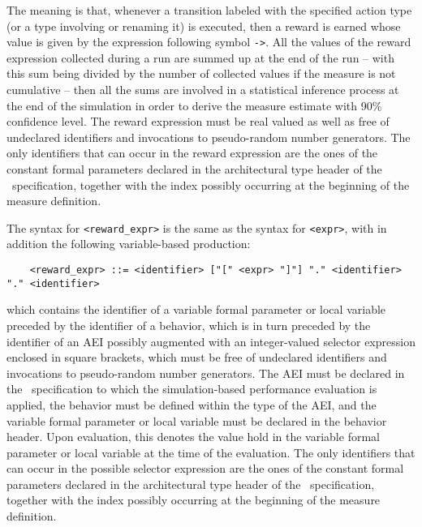 The meaning is that, whenever a transition labeled with the specified action type (or a type involving or
renaming it) is executed, then a reward is earned whose value is given by the expression following symbol
{\tt ->}. All the values of the reward expression collected during a run are summed up at the end of the run
-- with this sum being divided by the number of collected values if the measure is not cumulative -- then
all the sums are involved in a statistical inference process at the end of the simulation in order to derive
the measure estimate with 90\% confidence level. The reward expression must be real valued as well as free
of undeclared identifiers and invocations to pseudo-random number generators. The only identifiers that can
occur in the reward expression are the ones of the constant formal parameters declared in the architectural
type header of the \aemilia\ specification, together with the index possibly occurring at the beginning of
the measure definition.

The syntax for {\tt <reward\_expr>} is the same as the syntax for {\tt <expr>}, with in addition the
following variable-based production:

        \begin{verbatim}
    <reward_expr> ::= <identifier> ["[" <expr> "]"] "." <identifier> "." <identifier>
        \end{verbatim}

\noindent which contains the identifier of a variable formal parameter or local variable preceded by the
identifier of a behavior, which is in turn preceded by the identifier of an AEI possibly augmented with an
integer-valued selector expression enclosed in square brackets, which must be free of undeclared identifiers
and invocations to pseudo-random number generators. The AEI must be declared in the \aemilia\ specification
to which the simulation-based performance evaluation is applied, the behavior must be defined within the
type of the AEI, and the variable formal parameter or local variable must be declared in the behavior
header. Upon evaluation, this denotes the value hold in the variable formal parameter or local variable at
the time of the evaluation. The only identifiers that can occur in the possible selector expression are the
ones of the constant formal parameters declared in the architectural type header of the \aemilia\
specification, together with the index possibly occurring at the beginning of the measure definition.


